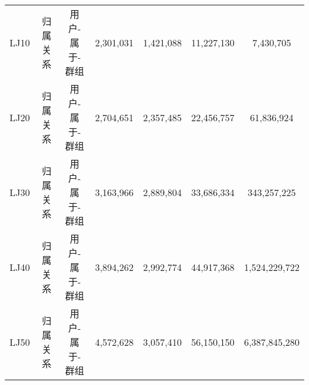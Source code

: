 \begin{table} [t]
\begin{center}
{\begin{tabular}{ccccccc}
      \hline
      LJ10 & 归属关系 & 用户-属于-群组& 2,301,031& 1,421,088& 11,227,130& 7,430,705\\
			LJ20 & 归属关系 & 用户-属于-群组& 2,704,651& 2,357,485& 22,456,757& 61,836,924\\
			LJ30 & 归属关系 & 用户-属于-群组& 3,163,966& 2,889,804& 33,686,334& 343,257,225\\
			LJ40 & 归属关系 & 用户-属于-群组& 3,894,262& 2,992,774& 44,917,368& 1,524,229,722\\
			LJ50 & 归属关系 & 用户-属于-群组& 4,572,628& 3,057,410& 56,150,150& 6,387,845,280\\
      

			\hline
		\end{tabular}
				}
	\end{center}
	\vspace{-0.1in}
\end{table}
